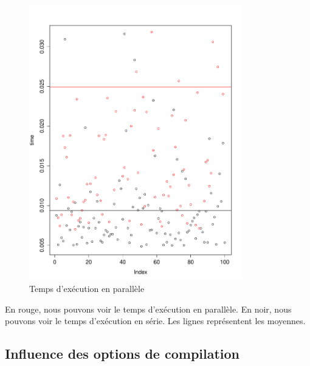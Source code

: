 \begin{figure}[H]
	\begin{center}
		\includegraphics[height=12cm]{diagrams/time_serial_paral.pdf}
		\caption{Temps d'exécution en parallèle}
		\label{fig:timeSerialParal}
	\end{center}
\end{figure}
En rouge, nous pouvons voir le temps d'exécution en parallèle.
En noir, nous pouvons voir le temps d'exécution en série.
Les lignes représentent les moyennes.


\subsection{Influence des options de compilation}



